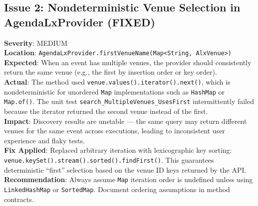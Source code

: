 \documentclass[11pt]{article}
\begin{document}
  \subsection{Issue 2: Nondeterministic Venue Selection in AgendaLxProvider (FIXED)}
  \textbf{Severity}: MEDIUM \\
  \textbf{Location}: \texttt{AgendaLxProvider.firstVenueName(Map<String, AlxVenue>)} \\
  \textbf{Expected}: When an event has multiple venues, the provider should consistently return the same venue (e.g., the first by insertion order or key order). \\
  \textbf{Actual}: The method used \texttt{venue.values().iterator().next()}, which is nondeterministic for unordered \texttt{Map} implementations such as \texttt{HashMap} or \texttt{Map.of()}. The unit test \texttt{search\_MultipleVenues\_UsesFirst} intermittently failed because the iterator returned the second venue instead of the first. \\
  \textbf{Impact}: Discovery results are unstable --- the same query may return different venues for the same event across executions, leading to inconsistent user experience and flaky tests. \\
  \textbf{Fix Applied}: Replaced arbitrary iteration with lexicographic key sorting: \texttt{venue.keySet().stream().sorted().findFirst()}. This guarantees deterministic ``first'' selection based on the venue ID keys returned by the API. \\
  \textbf{Recommendation}: Always assume \texttt{Map} iteration order is undefined unless using \texttt{LinkedHashMap} or \texttt{SortedMap}. Document ordering assumptions in method contracts.
\end{document}
